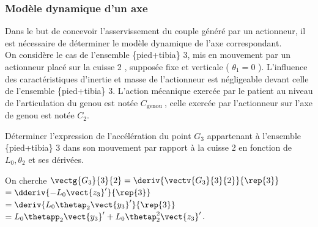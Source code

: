 \subsubsection{Modèle dynamique d'un axe}
Dans le but de concevoir l'asservissement du couple généré par un actionneur, il est nécessaire de déterminer le modèle dynamique de l'axe correspondant.\\
On considère le cas de l'ensemble \{pied+tibia\} 3, mis en mouvement par un actionneur placé sur la cuisse 2 , supposée fixe et verticale ( $\theta_{1}=0$ ). L'influence des caractéristiques d'inertie et masse de l'actionneur est négligeable devant celle de l'ensemble \{pied+tibia\} 3. L'action mécanique exercée par le patient au niveau de l'articulation du genou est notée $C_{\text {genou }}$, celle exercée par l'actionneur sur l'axe de genou est notée $C_{2}$.\\

\begin{question}
\label{2023_ccs_psi_q_14}
Déterminer l'expression de l'accélération du point $G_{3}$ appartenant à l'ensemble \{pied+tibia\} 3 dans son mouvement par rapport à la cuisse 2 en fonction de $L_{0}, \theta_{2}$ et ses dérivées.\\
\end{question}
\ifprof
\begin{corrige}
On cherche $\vectg{G_3}{3}{2} = \deriv{\vectv{G_3}{3}{2}}{\rep{3}}$ $= \dderiv{-L_0 \vect{z_3}'}{\rep{3}}$
$= \deriv{L_0 \thetap_2 \vect{y_3}'}{\rep{3}}$
$= L_0 \thetapp_2 \vect{y_3}' +L_0 \thetap_2^2 \vect{z_3}' $.

\end{corrige}
\else
\fi


